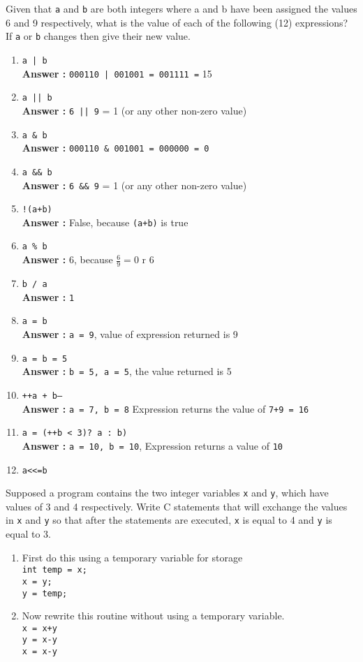 \documentclass[a4paper,11pt]{article}
\newcommand{\answer}{\textbf{Answer : }}
\newcommand{\cd}{\texttt}
\newcommand{\benu}{\begin{enumerate}}
\newcommand{\enu}{\end{enumerate}}
\begin{document}
\item Given that \cd{a} and \cd{b} are both integers where a and b have been assigned the values 6 and 9 respectively, what is the value of each of the following (12) expressions? If \cd{a} or \cd{b} changes then give their new value.
\benu
\item \cd{a | b} \\
\answer \cd{000110 | 001001 = 001111 =} 15
\item \cd{a || b } \\
\answer \cd{6 || 9} = 1 (or any other non-zero value)
\item \cd{a \& b} \\
\answer \cd{000110 \& 001001 = 000000 = 0}
\item \cd{a \&\& b} \\
\answer \cd{6 \&\& 9} = 1 (or any other non-zero value)
\item \cd{!(a+b)} \\
\answer False, because \cd{(a+b)} is true
\item \cd{a \% b} \\
\answer 6, because $\frac{6}{9} = 0 \text{ r } 6$
\item \cd{b / a} \\
\answer \cd{1}
\item \cd{a = b} \\
\answer \cd{a = 9}, value of expression returned is 9
\item \cd{a = b = 5} \\
\answer \cd{b = 5, a = 5}, the value returned is 5
\item \cd{++a + b--} \\
\answer \cd{a = 7, b = 8} Expression returns the value of \cd{7+9 = 16}
\item \cd{a = (++b < 3)? a : b)} \\
\answer \cd{a = 10, b = 10}, Expression returns a value of \cd{10}
\item \cd{a<<=b}
 \enu

 \item Supposed a program contains the two integer variables \cd{x} and \cd{y}, which have values of 3 and 4 respectively. Write C statements that will exchange the values in \cd{x} and \cd{y} so that after the statements are executed, \cd{x} is equal to 4 and \cd{y} is equal to 3.
 \benu
 \item First do this using a temporary variable for storage \\
 \cd{int temp = x;} \\
 \cd{x = y;} \\
 \cd{y = temp;} \\
 \item Now rewrite this routine without using a temporary variable. \\
 \cd{x = x+y} \\
 \cd{y = x-y} \\
 \cd{x = x-y} \\
 \enu
\end{document}
